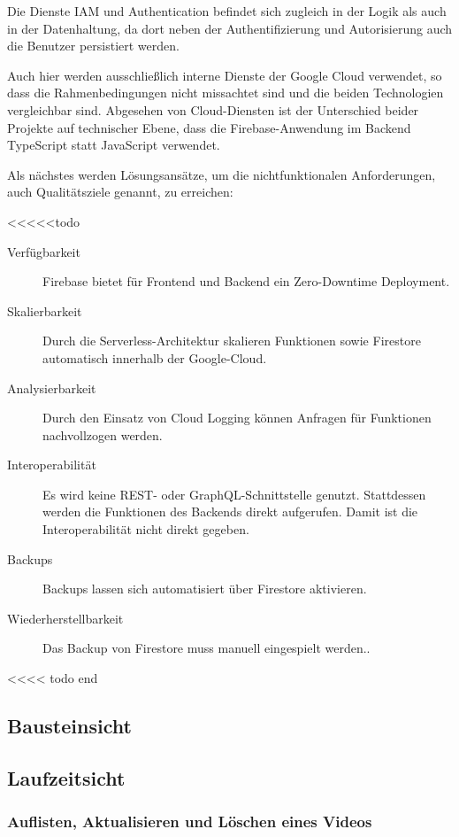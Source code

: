 Die Dienste IAM und Authentication befindet sich zugleich in der Logik als auch in der Datenhaltung, da dort neben der Authentifizierung und Autorisierung auch die Benutzer persistiert werden.

Auch hier werden ausschließlich interne Dienste der Google Cloud verwendet, so dass die Rahmenbedingungen nicht missachtet sind und die beiden Technologien vergleichbar sind. Abgesehen von Cloud-Diensten ist der Unterschied beider Projekte auf technischer Ebene, dass die Firebase-Anwendung im Backend TypeScript statt JavaScript verwendet.

Als nächstes werden Lösungsansätze, um die nichtfunktionalen Anforderungen, auch Qualitätsziele genannt, zu erreichen:

<<<<<todo
\begin{description}
   \item[Verfügbarkeit] Firebase bietet für Frontend und Backend ein Zero-Downtime Deployment.
   \item[Skalierbarkeit] Durch die Serverless-Architektur skalieren Funktionen sowie Firestore automatisch innerhalb der Google-Cloud.
   \item[Analysierbarkeit] Durch den Einsatz von Cloud Logging können Anfragen für Funktionen nachvollzogen werden.
   \item[Interoperabilität] Es wird keine REST- oder GraphQL-Schnittstelle genutzt. Stattdessen werden die Funktionen des Backends direkt aufgerufen. Damit ist die Interoperabilität nicht direkt gegeben.
   \item[Backups] Backups lassen sich automatisiert über Firestore aktivieren.
   \item[Wiederherstellbarkeit] Das Backup von Firestore muss manuell eingespielt werden..
\end{description}
<<<< todo end

\subsection{Bausteinsicht}

\subsection{Laufzeitsicht}

\subsubsection{Auflisten, Aktualisieren und Löschen eines Videos}

